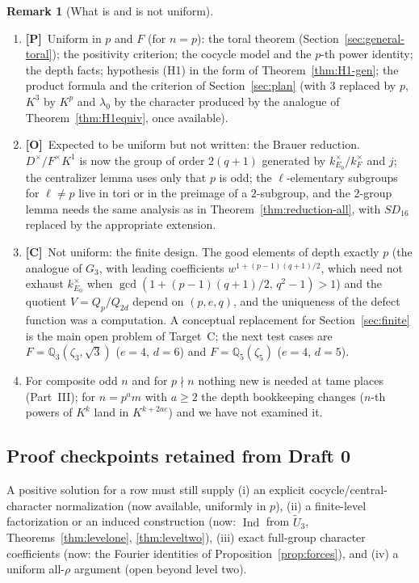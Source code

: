 \documentclass[11pt]{article}
\newcommand{\Q}{\mathbb Q}
\newcommand{\Ind}{\operatorname{Ind}}
\newcommand{\tU}{\widetilde U}
\newcommand{\Ptag}{\textnormal{\textbf{[P]}}}
\newcommand{\Otag}{\textnormal{\textbf{[O]}}}
\newcommand{\Ctag}{\textnormal{\textbf{[C]}}}
\theoremstyle{plain}
\theoremstyle{definition}
\newtheorem{remark}[theorem]{Remark}
\begin{document}
\begin{remark}[What is and is not uniform]\label{rem:uniform}
\begin{enumerate}[label=(\roman*)]
\item \Ptag\ Uniform in $p$ and $F$ (for $n=p$): the toral theorem
(Section~\ref{sec:general-toral}); the positivity criterion; the cocycle
model and the $p$-th power identity; the depth facts; hypothesis (H1)
in the form of Theorem~\ref{thm:H1-gen}; the product formula and the
criterion of Section~\ref{sec:plan} (with $3$ replaced by $p$, $K^3$ by
$K^{p}$ and $\lambda_0$ by the character produced by the analogue of
Theorem~\ref{thm:H1equiv}, once available).
\item \Otag\ Expected to be uniform but not written: the Brauer
reduction.  $D^\times/F^\times K^1$ is now the group of order $2(q+1)$
generated by $k_{E_0}^\times/k_F^\times$ and $j$; the centralizer lemma
uses only that $p$ is odd; the $\ell$-elementary subgroups for
$\ell\ne p$ live in tori or in the preimage of a $2$-subgroup, and
the $2$-group lemma needs the same analysis as in
Theorem~\ref{thm:reduction-all}, with $SD_{16}$ replaced by the
appropriate extension.
\item \Ctag\ Not uniform: the finite design.  The good elements of
depth exactly $p$ (the analogue of $G_3$, with leading coefficients
$w^{1+(p-1)(q+1)/2}$, which need not exhaust $k_{E_0}^\times$ when
$\gcd(1+(p-1)(q+1)/2,\,q^2-1)>1$) and the quotient $V=Q_p/Q_{2d}$ depend on
$(p,e,q)$, and the uniqueness of the defect function was a computation.
A conceptual replacement for Section~\ref{sec:finite} is the main open
problem of Target~C; the next test cases are $F=\Q_3(\zeta_3,\sqrt3)$
($e=4$, $d=6$) and $F=\Q_5(\zeta_5)$ ($e=4$, $d=5$).
\item For composite odd $n$ and for $p\nmid n$ nothing new is needed
at tame places (Part~III); for $n=p^a m$ with $a\ge2$ the depth
bookkeeping changes ($n$-th powers of $K^k$ land in $K^{k+2ae}$) and we
have not examined it.
\end{enumerate}
\end{remark}

\subsection{Proof checkpoints retained from Draft 0}
A positive solution for a row must still supply (i) an explicit
cocycle/central-character normalization (now available, uniformly in
$p$), (ii) a finite-level factorization or an induced construction
(now: $\Ind$ from $\tU_3$, Theorems~\ref{thm:levelone}, \ref{thm:leveltwo}),
(iii) exact full-group character coefficients (now: the Fourier
identities of Proposition~\ref{prop:forces}), and (iv) a uniform
all-$\rho$ argument (open beyond level two).
\end{document}
